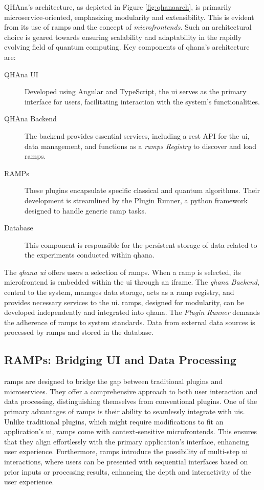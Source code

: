 \documentclass[
  a4paper,  %
  twoside,  %
  bibliography=totoc,
  headsepline,
  cleardoublepage=empty,
  parskip=half,
  draft=false
]{scrbook}
\begin{document}
QHAna's architecture, as depicted in Figure \ref{fig:qhanaarch}, is primarily microservice-oriented, emphasizing modularity and extensibility.
This is evident from its use of \glspl{ramp} and the concept of \emph{microfrontends}.
Such an architectural choice is geared towards ensuring scalability and adaptability in the rapidly evolving field of quantum computing.
Key components of \gls{qhana}'s architecture are:
\begin{description}
  \item[QHAna UI] Developed using Angular and TypeScript, the \gls{ui} serves as the primary interface for users, facilitating interaction with the system's functionalities.
  \item[QHAna Backend] The backend provides essential services, including a \gls{rest} API for the \gls{ui}, data management, and functions as a \emph{\glspl{ramp} Registry} to discover and load \glspl{ramp}.
  \item[RAMPs] These plugins encapsulate specific classical and quantum algorithms. Their development is streamlined by the Plugin Runner, a python framework designed to handle generic \gls{ramp} tasks.
  \item[Database] This component is responsible for the persistent storage of data related to the experiments conducted within \gls{qhana}.
\end{description}

The \emph{\gls{qhana} \gls{ui}} offers users a selection of \glspl{ramp}.
When a \gls{ramp} is selected, its microfrontend is embedded within the \gls{ui} through an iframe.
The \emph{\gls{qhana} Backend}, central to the system, manages data storage, acts as a \gls{ramp} registry, and provides necessary services to the \gls{ui}.
\glspl{ramp}, designed for modularity, can be developed independently and integrated into \gls{qhana}.
The \emph{Plugin Runner} demands the adherence of \glspl{ramp} to system standards.
Data from external data sources is processed by \glspl{ramp} and stored in the database.

\subsection{RAMPs: Bridging UI and Data Processing}
\label{subsec:ramps}

\glspl{ramp} are designed to bridge the gap between traditional plugins and microservices.
They offer a comprehensive approach to both user interaction and data processing, distinguishing themselves from conventional plugins.
One of the primary advantages of \glspl{ramp} is their ability to seamlessly integrate with \glspl{ui}.
Unlike traditional plugins, which might require modifications to fit an application's \gls{ui}, \glspl{ramp} come with context-sensitive microfrontends.
This ensures that they align effortlessly with the primary application's interface, enhancing user experience.
Furthermore, \glspl{ramp} introduce the possibility of multi-step \gls{ui} interactions, where users can be presented with sequential interfaces based on prior inputs or processing results, enhancing the depth and interactivity of the user experience.
\end{document}
